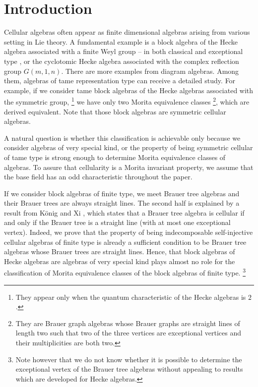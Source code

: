 \documentclass[12pt]{amsart}
\numberwithin{equation}{thm}
\newcounter{ni}
\begin{document}
\begin{abstract}
We classify Morita equivalence classes of indecomposable self-injective cellular algebras 
which have polynomial growth representation type, 
assuming that the base field has an odd characteristic. 
This assumption on the characteristic is for the cellularity to be
a Morita invariant property.
\end{abstract}


\section{Introduction}

Cellular algebras often appear as finite dimensional algebras arising from various setting in Lie theory. 
A fundamental example is a block algebra of the Hecke algebra associated with a finite Weyl group 
-- in both classical and exceptional type \cite{G},
or the cyclotomic Hecke algebra associated with the complex reflection group $G(m,1,n)$. 
There are more examples from diagram algebras. 
Among them, algebras of tame representation type can receive a detailed study. 
For example, if we consider tame block algebras of the Hecke algebras associated with the symmetric group,
\footnote{They appear only when the quantum characteristic of the Hecke algebras is $2$.}
we have only two Morita equivalence classes
\footnote{They are Brauer graph algebras whose Brauer graphs are straight lines of length two 
such that two of the three vertices are exceptional vertices and their multiplicities are both two.},
which are derived equivalent. Note that those block algebras are symmetric cellular algebras. 

A natural question is whether this classification is achievable only because we consider algebras of very special kind, or 
the property of being symmetric cellular of tame type is strong enough to determine 
Morita equivalence classes of algebras. 
To assure that cellularity is a Morita invariant property, 
we assume that the base field has an odd characteristic throughout the paper.

If we consider block algebras of finite type, we meet Brauer tree algebras and their Brauer trees are always straight lines. 
The second half is explained by a result from K\"onig and Xi \cite{KX1}, which states that a Brauer tree algebra is cellular 
if and only if the Brauer tree is a straight line (with at most one exceptional vertex). 
Indeed, we prove that the property of being indecomposable self-injective cellular algebras 
of finite type is already a sufficient condition to be Brauer tree algebras whose Brauer trees are straight lines. 
Hence, that block algebras of Hecke algebras are algebras of very special kind plays almost 
no role for the classification of Morita equivalence classes of the block algebras of finite type.
\footnote{Note however that we do not know whether it is possible to determine the exceptional vertex of the Brauer tree algebras 
without appealing to results which are developed for Hecke algebras.}
\end{document}
